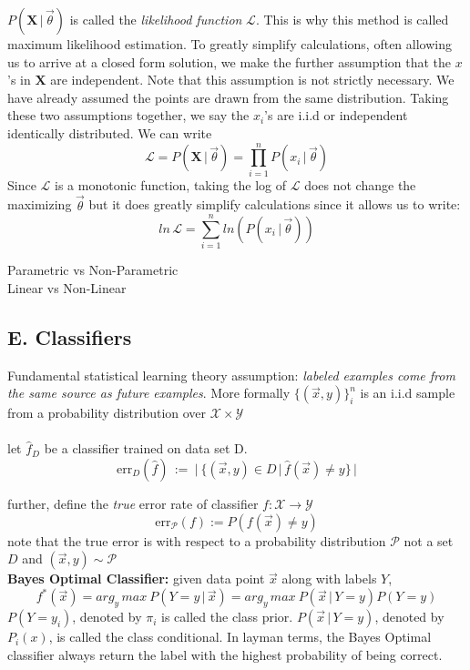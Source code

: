 \documentclass[10pt]{article}
\begin{document}
			\noindent $P(\mathbf{X} \, | \, \vec \theta)$ is called the \textit{likelihood function} $\mathcal{L}$. 
			This is why this method is called maximum likelihood estimation. To greatly simplify calculations, 
			often allowing us to arrive at a closed form solution, we make the further assumption that the 
			$x$'s in $\mathbf{X}$ are independent. Note that this assumption is not strictly necessary. We have 
			already assumed the points are drawn from the same distribution. Taking these
			two assumptions together, we say the $x_i$'s are i.i.d or independent identically distributed. We can write 
			$$\mathcal{L} = P(\mathbf{X} \, | \, \vec \theta) = \prod_{i=1}^{n}P(x_i \, | \, \vec \theta)$$
			Since $\mathcal L$ is a monotonic function, taking the log of $\mathcal L$ does not change the maximizing 
			$\vec \theta$ but it does greatly simplify calculations since it allows us to write:
			$$ln \, \mathcal L = \sum_{i=1}^{n} ln (P(x_i \, | \, \vec \theta))$$
			
			
			 Parametric vs Non-Parametric \\
			 Linear vs Non-Linear
			 
			 
		\subsection*{E. Classifiers}
			Fundamental statistical learning theory assumption: \textit{labeled examples come from the same
			source as future examples}. More formally $ \{(\vec x, y)\}_i^n$ is an i.i.d sample from a probability
			distribution over $\mathcal{X} \times \mathcal{Y} $ \\ \\
			let $\hat f_D$ be a classifier trained on data set D. 
			$$ \textrm{err}_D(\hat f) \, := \ \lvert\  \{ (\vec x, y) \in D \, | \, \hat f(\vec x) \not = y\} \, \rvert $$ 
			
			\noindent further, define the \textit{true} error rate of classifier $f: \mathcal X\rightarrow \mathcal Y $\\
			$$\textrm{err}_{\mathcal{P}}(f) := P(f(\vec x) \not = y) $$
			note that the true error is with respect to a probability distribution $\mathcal P$ not a set $D$ and 
			$ (\vec x,  y) \sim \mathcal  P$\\
			
			\noindent \textbf{Bayes Optimal Classifier:} given data point $\vec x$ along with labels $Y$,
			$$ f^*(\vec x) = arg_y \, max \ P(Y = y\, | \, \vec x ) = arg_y \, max \ P(\vec x \, | \, Y=y)P(Y = y)$$
			$P(Y=y_i)$, denoted by $\pi_i$ is called the class prior. $P(\vec x \, | \, Y=y)$, denoted by $P_i(x)$,
			is called the class conditional. In layman terms, the Bayes Optimal classifier always return the 
			label with the highest probability of being correct. \\\
			
\end{document}
